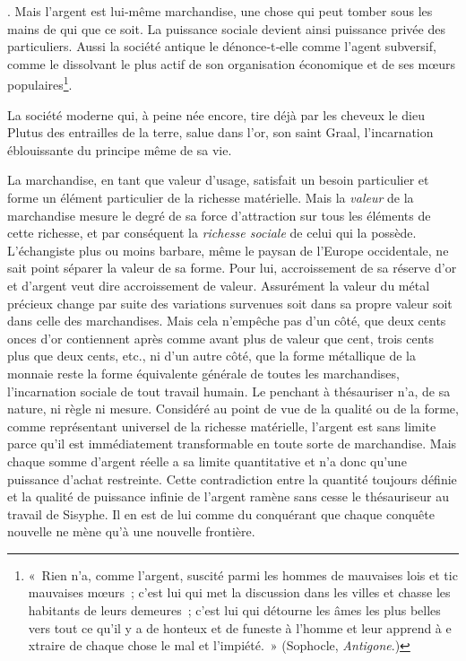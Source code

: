 \documentclass[french,twoside]{book} %
\begin{document}
{}. Mais l’argent est lui‑même marchandise, une chose qui peut tomber sous les mains de qui que ce soit. La puissance sociale devient ainsi puissance privée des particuliers. Aussi la société antique le dénonce‑t‑elle comme l’agent subversif, comme le dissolvant le plus actif de son organisation économique et de ses mœurs populaires\footnote{« Rien n’a, comme l’argent, suscité parmi les hommes de mauvaises lois et tic mauvaises mœurs ; c’est lui qui met la discussion dans les villes et chasse les habitants de leurs demeures ; c’est lui qui détourne les âmes les plus belles vers tout ce qu’il y a de honteux et de funeste à l’homme et leur apprend à e xtraire de chaque chose le mal et l’impiété. » (Sophocle, \emph{Antigone}.)}.\par
La société moderne qui, à peine née encore, tire déjà par les cheveux le dieu Plutus des entrailles de la terre, salue dans l’or, son saint Graal, l’incarnation éblouissante du principe même de sa vie.\par
La marchandise, en tant que valeur d’usage, satisfait un besoin particulier et forme un élément particulier de la richesse matérielle. Mais la \emph{valeur} de la marchandise mesure le degré de sa force d’attraction sur tous les éléments de cette richesse, et par conséquent la \emph{richesse sociale} de celui qui la possède. L’échangiste plus ou moins barbare, même le paysan de l’Europe occidentale, ne sait point séparer la valeur de sa forme. Pour lui, accroissement de sa réserve d’or et d’argent veut dire accroissement de valeur. Assurément la valeur du métal précieux change par suite des variations survenues soit dans sa propre valeur soit dans celle des marchandises. Mais cela n’empêche pas d’un côté, que deux cents onces d’or contiennent après comme avant plus de valeur que cent, trois cents plus que deux cents, etc., ni d’un autre côté, que la forme métallique de la monnaie reste la forme équivalente générale de toutes les marchandises, l’incarnation sociale de tout travail humain. Le penchant à thésauriser n’a, de sa nature, ni règle ni mesure. Considéré au point de vue de la qualité ou de la forme, comme représentant universel de la richesse matérielle, l’argent est sans limite parce qu’il est immédiatement transformable en toute sorte de marchandise. Mais chaque somme d’argent réelle a sa limite quantitative et n’a donc qu’une puissance d’achat restreinte. Cette contradiction entre la quantité toujours définie et la qualité de puissance infinie de l’argent ramène sans cesse le thésauriseur au travail de Sisyphe. Il en est de lui comme du conquérant que chaque conquête nouvelle ne mène qu’à une nouvelle frontière.\par
\end{document}
